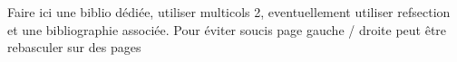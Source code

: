 Faire ici une biblio dédiée, utiliser multicols 2, eventuellement utiliser refsection et une bibliographie associée.
Pour éviter soucis page gauche / droite peut être rebasculer sur des pages 